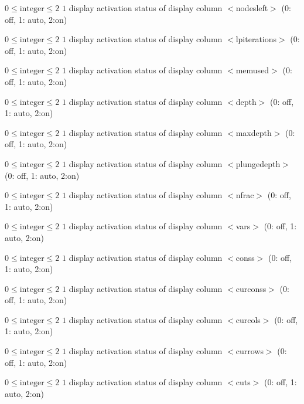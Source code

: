 %
{$0\leq\textrm{integer}\leq2$}%
{$1$}%
{display activation status of display column $<$nodesleft$>$ (0: off, 1: auto, 2:on)}%
{}

%
{$0\leq\textrm{integer}\leq2$}%
{$1$}%
{display activation status of display column $<$lpiterations$>$ (0: off, 1: auto, 2:on)}%
{}

%
{$0\leq\textrm{integer}\leq2$}%
{$1$}%
{display activation status of display column $<$memused$>$ (0: off, 1: auto, 2:on)}%
{}

%
{$0\leq\textrm{integer}\leq2$}%
{$1$}%
{display activation status of display column $<$depth$>$ (0: off, 1: auto, 2:on)}%
{}

%
{$0\leq\textrm{integer}\leq2$}%
{$1$}%
{display activation status of display column $<$maxdepth$>$ (0: off, 1: auto, 2:on)}%
{}

%
{$0\leq\textrm{integer}\leq2$}%
{$1$}%
{display activation status of display column $<$plungedepth$>$ (0: off, 1: auto, 2:on)}%
{}

%
{$0\leq\textrm{integer}\leq2$}%
{$1$}%
{display activation status of display column $<$nfrac$>$ (0: off, 1: auto, 2:on)}%
{}

%
{$0\leq\textrm{integer}\leq2$}%
{$1$}%
{display activation status of display column $<$vars$>$ (0: off, 1: auto, 2:on)}%
{}

%
{$0\leq\textrm{integer}\leq2$}%
{$1$}%
{display activation status of display column $<$conss$>$ (0: off, 1: auto, 2:on)}%
{}

%
{$0\leq\textrm{integer}\leq2$}%
{$1$}%
{display activation status of display column $<$curconss$>$ (0: off, 1: auto, 2:on)}%
{}

%
{$0\leq\textrm{integer}\leq2$}%
{$1$}%
{display activation status of display column $<$curcols$>$ (0: off, 1: auto, 2:on)}%
{}

%
{$0\leq\textrm{integer}\leq2$}%
{$1$}%
{display activation status of display column $<$currows$>$ (0: off, 1: auto, 2:on)}%
{}

%
{$0\leq\textrm{integer}\leq2$}%
{$1$}%
{display activation status of display column $<$cuts$>$ (0: off, 1: auto, 2:on)}%
{}

